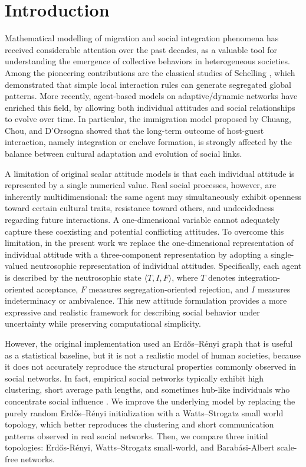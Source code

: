 \documentclass[11pt,a4paper]{article}
\newcommand{\nstriple}[1]{\langle #1 \rangle}
\begin{document}
	\section{Introduction}
	Mathematical modelling of migration and social integration phenomena has received considerable attention over the past decades, as a valuable tool for understanding the emergence of collective behaviors in heterogeneous societies. Among the pioneering contributions are the classical studies of Schelling \cite{schelling1969,schelling1971}, which demonstrated that simple local interaction rules can generate segregated global patterns. 
	More recently, agent-based models on adaptive/dynamic networks have enriched this field, by allowing both individual attitudes and social relationships to evolve over time. In particular, the immigration model proposed by Chuang, Chou, and D'Orsogna \cite{chuang2019,chuang2020} showed that the long-term outcome of host-guest interaction, namely integration or enclave formation, is strongly affected by the balance between cultural adaptation and evolution of social links.
	
	A limitation of original scalar attitude models is that each individual attitude is represented by a single numerical value. Real social processes, however, are inherently multidimensional: the same agent may simultaneously exhibit  openness toward certain cultural traits, resistance toward others, and undecidedness regarding future interactions.
	A one-dimensional variable cannot adequately capture these coexisting and potential conflicting attitudes. To overcome this limitation, in the present work we replace the one-dimensional representation of individual attitude with a three-component representation by adopting a single-valued neutrosophic representation of individual attitudes. Specifically, each agent is described by the neutrosophic state $\nstriple{T,I,F}$, where $T$ denotes integration-oriented acceptance, $F$ measures segregation-oriented rejection, and $I$ measures indeterminacy or ambivalence.
	This new attitude formulation provides a more expressive and realistic framework for describing social behavior under uncertainty while preserving computational simplicity.
	
	However, the original implementation used an Erd\H{o}s--R\'enyi graph that is useful as a statistical baseline, but it is not a realistic model of human societies, because it does not accurately reproduce the structural properties commonly observed in social networks. In fact, empirical social networks typically exhibit high clustering, short average path lengths, and sometimes hub-like individuals who concentrate social influence \cite{watts1998, barabasi1999, newman2010,barrat2008}. We improve the underlying model by replacing the purely random Erd\H{o}s--R\'enyi initialization with a Watts--Strogatz small world topology, which better reproduces the clustering and short communication patterns observed in real social networks. Then, we compare three initial topologies: Erd\H{o}s-R\'enyi, Watts--Strogatz small-world, and Barab\'asi-Albert scale-free networks. 
	
\end{document}

